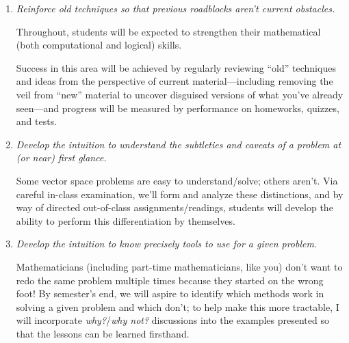 \documentclass[12pt,oneside]{amsart}
\begin{document}
\begin{enumerate}[label=(Obj \arabic*),leftmargin=0.75in,rightmargin=0.25in,itemsep=1.5mm]
	\item \textit{Reinforce old techniques so that previous roadblocks aren't current obstacles.}
	
	Throughout, students will be expected to strengthen their mathematical (both computational and logical) skills.
	
	Success in this area will be achieved by regularly reviewing ``old'' techniques and ideas from the perspective of current material---including removing the veil from ``new'' material to uncover disguised versions of what you've already seen---and progress will be measured by performance on homeworks, quizzes, and tests. 

	\item \textit{Develop the intuition to understand the subtleties and caveats of a problem at (or near) first glance.} 
	
	Some vector space problems are easy to understand/solve; others aren't. Via careful in-class examination, we'll form and analyze these distinctions, and by way of directed out-of-class assignments/readings, students will develop the ability to perform this differentiation by themselves.
	
	\item \textit{Develop the intuition to know precisely {} tools to use for a given problem.}
	
	Mathematicians (including part-time mathematicians, like you) don't want to redo the same problem multiple times because they started on the wrong foot! By semester's end, we will aspire to identify which methods work in solving a given problem and which don't; to help make this more tractable, I will incorporate \textit{why?}/\textit{why not?} discussions into the examples presented so that the lessons can be learned firsthand.
\end{enumerate}

\end{document}

